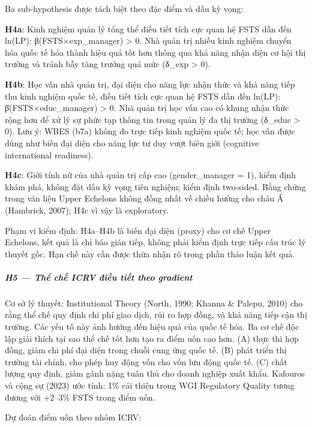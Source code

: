 \documentclass[12pt,a4paper]{article}
\begin{document}
Ba sub-hypothesis được tách biệt theo đặc điểm và dấu kỳ vọng:

\textbf{H4a}: Kinh nghiệm quản lý tổng thể điều tiết tích cực quan hệ
FSTS dẫn đến ln(LP): β(FSTS×exp\_manager) \textgreater{} 0. Nhà quản trị
nhiều kinh nghiệm chuyển hóa quốc tế hóa thành hiệu quả tốt hơn thông
qua khả năng nhận diện cơ hội thị trường và tránh bẫy tăng trưởng quá
mức (δ\_exp \textgreater{} 0).

\textbf{H4b}: Học vấn nhà quản trị, đại diện cho năng lực nhận thức và
khả năng tiếp thu kinh nghiệm quốc tế, điều tiết tích cực quan hệ FSTS
dẫn đến ln(LP): β(FSTS×educ\_manager) \textgreater{} 0. Nhà quản trị học
vấn cao có khung nhận thức rộng hơn để xử lý sự phức tạp thông tin trong
quản lý đa thị trường (δ\_educ \textgreater{} 0). Lưu ý: WBES (b7a)
không đo trực tiếp kinh nghiệm quốc tế; học vấn được dùng như biến đại
diện cho năng lực tư duy vượt biên giới (cognitive international
readiness).

\textbf{H4c}: Giới tính nữ của nhà quản trị cấp cao (gender\_manager =
1), kiểm định khám phá, không đặt dấu kỳ vọng tiên nghiệm; kiểm định
two-sided. Bằng chứng trong văn liệu Upper Echelons không đồng nhất về
chiều hướng cho châu Á (Hambrick, 2007); H4c vì vậy là exploratory.

Phạm vi kiểm định: H4a--H4b là biến đại diện (proxy) cho cơ chế Upper
Echelons, kết quả là chỉ báo gián tiếp, không phải kiểm định trực tiếp
cấu trúc lý thuyết gốc. Hạn chế này cần được thừa nhận rõ trong phần
thảo luận kết quả.

\hypertarget{h5--thux1ec3-chux1ebf-icrv-ux111iux1ec1u-tiux1ebft-theo-gradient}{%
\subparagraph{H5 --- Thể chế ICRV điều tiết theo
gradient}\label{h5--thux1ec3-chux1ebf-icrv-ux111iux1ec1u-tiux1ebft-theo-gradient}}

Cơ sở lý thuyết: Institutional Theory (North, 1990; Khanna \& Palepu,
2010) cho rằng thể chế quy định chi phí giao dịch, rủi ro hợp đồng, và
khả năng tiếp cận thị trường. Các yếu tố này ảnh hưởng đến hiệu quả của
quốc tế hóa. Ba cơ chế độc lập giải thích tại sao thể chế tốt hơn tạo ra
điểm uốn cao hơn. (A) thực thi hợp đồng, giảm chi phí đại diện trong
chuỗi cung ứng quốc tế. (B) phát triển thị trường tài chính, cho phép
huy động vốn cho vốn lưu động quốc tế. (C) chất lượng quy định, giảm
gánh nặng tuân thủ cho doanh nghiệp xuất khẩu. Kafouros và cộng sự
(2023) ước tính: 1\% cải thiện trong WGI Regulatory Quality tương đương
với +2--3\% FSTS trong điểm uốn.

Dự đoán điểm uốn theo nhóm ICRV:
\end{document}
